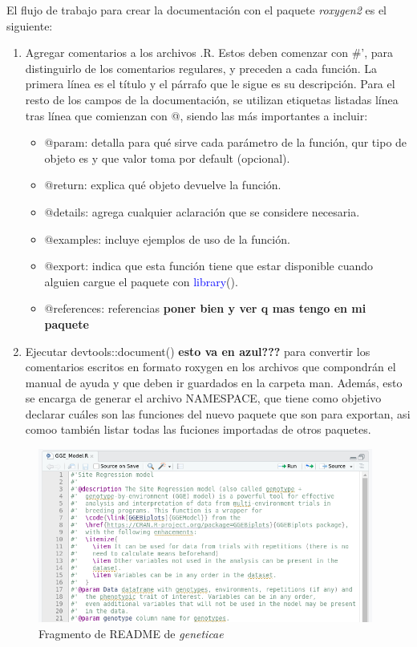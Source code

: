 El flujo de trabajo para crear la documentación con el paquete \emph{roxygen2} es el siguiente:

\begin{enumerate}

\item Agregar comentarios a los archivos .R. Estos deben comenzar con \#', para distinguirlo de los comentarios regulares, y preceden a cada función. La primera línea es el título y el párrafo que le sigue es su descripción. Para el resto de los campos de la documentación, se utilizan etiquetas listadas línea tras línea que comienzan con @, siendo las más importantes a incluir:

\begin{itemize}
\item @param: detalla para qué sirve cada parámetro de la función, qur tipo de objeto es y que valor toma por default (opcional).
\item @return: explica qué objeto devuelve la función.
\item @details: agrega cualquier aclaración que se considere necesaria.
\item @examples: incluye ejemplos de uso de la función.
\item @export: indica que esta función tiene que estar disponible cuando alguien cargue el paquete con \textcolor{blue}{library}().
\item @references: referencias \textbf{poner bien y ver q mas tengo en mi paquete}
\end{itemize}

\item Ejecutar devtools::document() \textbf{esto va en azul???} para convertir los comentarios escritos en formato roxygen en los archivos que compondrán el manual de ayuda y que deben ir guardados en la carpeta man. Además, esto se encarga de generar el archivo NAMESPACE, que tiene como objetivo declarar cuáles son las funciones del nuevo paquete que son para exportan, asi comoo también listar todas las fuciones importadas de otros paquetes.

\end{enumerate}

\begin{figure}[H]
	\begin{center}
		\includegraphics[width=11cm]{./Graficos/COMENTARIOSROXYGEN.png}	
	\end{center}
	\caption{Fragmento de README de \emph{geneticae}}
	\label{fig:fig36}
\end{figure}


